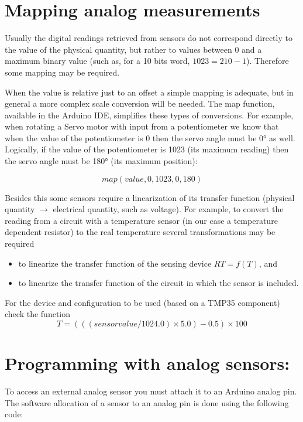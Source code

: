 \documentclass[10pt]{article}
\begin{document}
\section{Mapping analog measurements}\label{s:mapping}

Usually the digital readings retrieved from sensors do not correspond directly
to the value of the physical quantity, but rather to values between 0 and a
maximum binary value (such as, for a 10 bits word, $1023 = 210 - 1$). Therefore
some mapping may be required.

When the value is relative just to an offset a simple mapping is adequate, but
in general a more complex scale conversion will be needed. The map function,
available in the Arduino IDE, simplifies these types of conversions. For
example, when rotating a Servo motor with input from a potentiometer we know
that when the value of the potentiometer is 0 then the servo angle must be 0° as
well. Logically, if the value of the potentiometer is 1023 (its maximum reading)
then the servo angle must be 180° (its maximum position):

\[map(value, 0, 1023, 0, 180)\]

Besides this some sensors require a linearization of its transfer function
(physical quantity $\rightarrow$ electrical quantity, such as voltage). For
example, to convert the reading from a circuit with a temperature sensor (in our
case a temperature dependent resistor) to the real temperature several
transformations may be required

\begin{itemize}
    \item to linearize the transfer function of the sensing device $RT = f(T)$, and
    \item to linearize the transfer function of the circuit in which the sensor
        is included.
\end{itemize}

For the device and configuration to be used (based on a TMP35 component) check the function
\[T = (((sensor value / 1024.0) \times 5.0) - 0.5) \times  100\]

\section{Programming with analog sensors:}
To access an external analog sensor you must attach it to an Arduino analog pin. The software allocation of a sensor to an analog pin is done using the following code:
\end{document}
